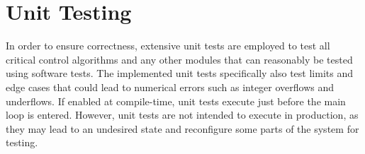 \section{Unit Testing}

In order to ensure correctness, extensive unit tests are employed to test all critical control algorithms and any other modules that can reasonably be tested using software tests. The implemented unit tests specifically also test limits and edge cases that could lead to numerical errors such as integer overflows and underflows. If enabled at compile-time, unit tests execute just before the main loop is entered. However, unit tests are not intended to execute in production, as they may lead to an undesired state and reconfigure some parts of the system for testing.
